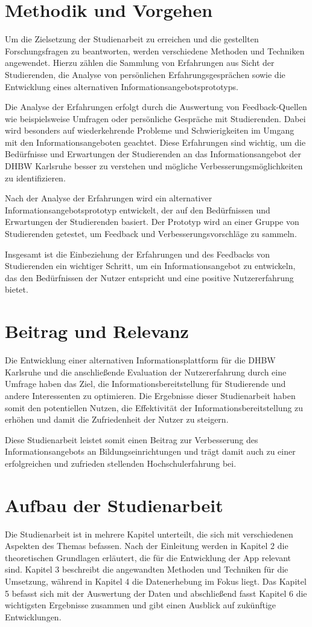 \section{Methodik und Vorgehen}
Um die Zielsetzung der Studienarbeit zu erreichen und die gestellten Forschungsfragen zu beantworten, werden verschiedene Methoden und Techniken angewendet. Hierzu zählen die Sammlung von Erfahrungen aus Sicht der Studierenden, die Analyse von persönlichen Erfahrungsgesprächen sowie die Entwicklung eines alternativen Informationsangebotsprototyps.

Die Analyse der Erfahrungen erfolgt durch die Auswertung von Feedback-Quellen wie beispielsweise Umfragen oder persönliche Gespräche mit Studierenden. Dabei wird besonders auf wiederkehrende Probleme und Schwierigkeiten im Umgang mit den Informationsangeboten geachtet. Diese Erfahrungen sind wichtig, um die Bedürfnisse und Erwartungen der Studierenden an das Informationsangebot der DHBW Karlsruhe besser zu verstehen und mögliche Verbesserungsmöglichkeiten zu identifizieren.

Nach der Analyse der Erfahrungen wird ein alternativer Informationsangebotsprototyp entwickelt, der auf den Bedürfnissen und Erwartungen der Studierenden basiert. Der Prototyp wird an einer Gruppe von Studierenden getestet, um Feedback und Verbesserungsvorschläge zu sammeln.

Insgesamt ist die Einbeziehung der Erfahrungen und des Feedbacks von Studierenden ein wichtiger Schritt, um ein Informationsangebot zu entwickeln, das den Bedürfnissen der Nutzer entspricht und eine positive Nutzererfahrung bietet.


\section{Beitrag und Relevanz}
Die Entwicklung einer alternativen Informationsplattform für die DHBW Karlsruhe und die anschließende Evaluation der Nutzererfahrung durch eine Umfrage haben das Ziel, die Informationsbereitstellung für Studierende und andere Interessenten zu optimieren. Die Ergebnisse dieser Studienarbeit haben somit den potentiellen Nutzen, die Effektivität der Informationsbereitstellung zu erhöhen und damit die Zufriedenheit der Nutzer zu steigern.

Diese Studienarbeit leistet somit einen Beitrag zur Verbesserung des Informationsangebots an Bildungseinrichtungen und trägt damit auch zu einer erfolgreichen und zufrieden stellenden Hochschulerfahrung bei.
\newpage

\section{Aufbau der Studienarbeit}
Die Studienarbeit ist in mehrere Kapitel unterteilt, die sich mit verschiedenen Aspekten des Themas befassen. Nach der Einleitung werden in Kapitel 2 die theoretischen Grundlagen erläutert, die für die Entwicklung der App relevant sind. Kapitel 3 beschreibt die angewandten Methoden und Techniken für die Umsetzung, während in Kapitel 4 die Datenerhebung im Fokus liegt. Das Kapitel 5 befasst sich mit der Auswertung der Daten und abschließend fasst Kapitel 6 die wichtigsten Ergebnisse zusammen und gibt einen Ausblick auf zukünftige Entwicklungen.
